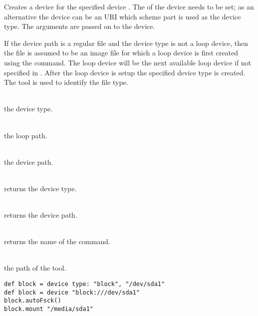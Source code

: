 %


Creates a device for the specified device . The 
of the device needs to be set; as an alternative the device 
can be an URI which scheme part is used as the device type.
The  arguments are passed on to the device.

If the device path is a regular file and the device type is not a loop device, 
then the file is assumed to be an image file for which a loop device is 
first created using the  command. The loop device will be the
next available loop device if not specified in .
After the loop device is setup the specified device type is created.
The \cite{mancxfile13} tool is used to identify the file type.

\begin{asparadesc}
%
\item[\code{type}] \hfill \\
the device type.
%
\item[\code{loop}] \hfill \\
the loop path.
%
\item[\code{device}] \hfill \\
the device path.
%
\item[\code{theType}] \hfill \\
returns the device type.
%
\item[\code{theDevice}] \hfill \\
returns the device path.
%
\item[\code{theName}] \hfill \\
returns the name of the command.
%
\item[\code{FILE\_COMMAND}] \hfill \\
the path of the  tool.
%
\end{asparadesc}

\begin{lstlisting}[style=Groovybash, label={lst:example_device1}, title={
Creates a block device for the device path.}]
def block = device type: "block", "/dev/sda1"
def block = device "block:///dev/sda1"
block.autoFsck()
block.mount "/media/sda1"
\end{lstlisting}

